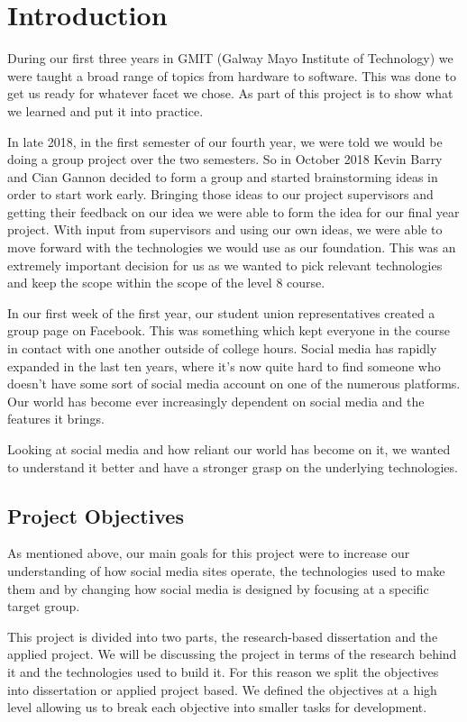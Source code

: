 \chapter{Introduction}
During our first three years in GMIT (Galway Mayo Institute of Technology) we were taught a broad range of topics from hardware to software. This was done to get us ready for whatever facet we chose. As part of this project is to show what we learned and put it into practice.

In late 2018, in the first semester of our fourth year, we were told we would be doing a group project over the two semesters. So in October 2018 Kevin Barry and Cian Gannon decided to form a group and started brainstorming ideas in order to start work early. Bringing those ideas to our project supervisors and getting their feedback on our idea we were able to form the idea for our final year project. With input from supervisors and using our own ideas, we were able to move forward with the technologies we would use as our foundation. This was an extremely important decision for us as we wanted to pick relevant technologies and keep the scope within the scope of the level 8 course. 

In our first week of the first year, our student union representatives created a group page on Facebook. This was something which kept everyone in the course in contact with one another outside of college hours. Social media has rapidly expanded in the last ten years, where it's now quite hard to find someone who doesn't have some sort of social media account on one of the numerous platforms. Our world has become ever increasingly dependent on social media and the features it brings.

Looking at social media and how reliant our world has become on it, we wanted to understand it better and have a stronger grasp on the underlying technologies.

\section{Project Objectives} \label{objectives}
As mentioned above, our main goals for this project were to increase our understanding of how social media sites operate, the technologies used to make them and by changing how social media is designed by focusing at a specific target group.

This project is divided into two parts, the research-based dissertation and the applied project. We will be discussing the project in terms of the research behind it and the technologies used to build it. For this reason we split the objectives into dissertation or applied project based. We defined the objectives at a high level allowing us to break each objective into smaller tasks for development.


